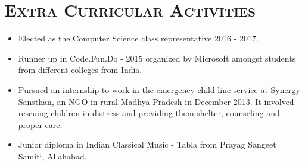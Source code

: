 \documentclass{article}
\newcommand{\tmpsection}[1]{}
\let\tmpsection=\section
\renewcommand{\section}[1]{\tmpsection*{\textsc{#1}}}
\begin{document}
\section{Extra Curricular Activities}

\begin{itemize}
    \setlength\itemsep{0em}
    \item Elected as the Computer Science class representative 2016 - 2017.
    \item Runner up in Code.Fun.Do - 2015 organized by Microsoft amongst students from different colleges from India.
    \item Pursued an internship to work in the emergency child line service at Synergy Sansthan, an NGO in rural Madhya Pradesh in December 2013. It involved rescuing children in distress and providing them shelter, counseling and proper care.
    \item Junior diploma in Indian Classical Music - Tabla from Prayag Sangeet Samiti, Allahabad. 
\end{itemize}
\end{document}
